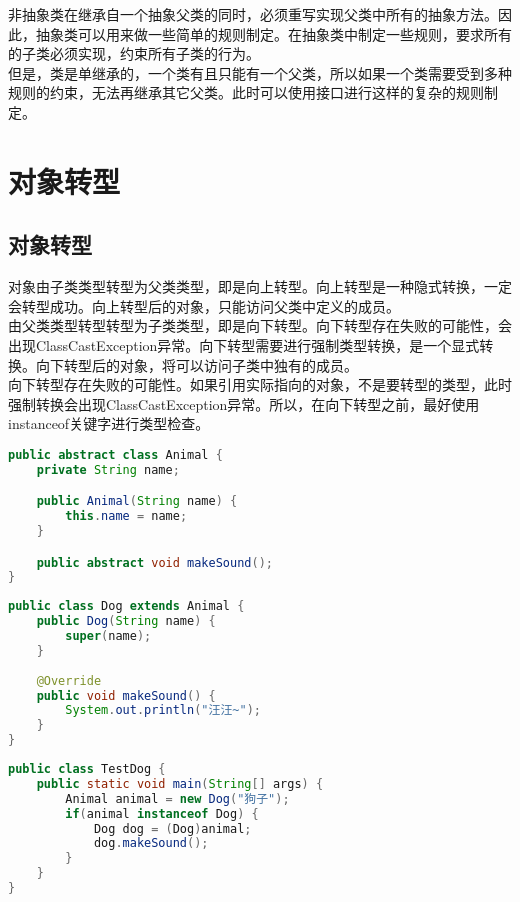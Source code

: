 非抽象类在继承自一个抽象父类的同时，必须重写实现父类中所有的抽象方法。因此，抽象类可以用来做一些简单的规则制定。在抽象类中制定一些规则，要求所有的子类必须实现，约束所有子类的行为。\\

但是，类是单继承的，一个类有且只能有一个父类，所以如果一个类需要受到多种规则的约束，无法再继承其它父类。此时可以使用接口进行这样的复杂的规则制定。

\newpage

\section{对象转型}

\subsection{对象转型}

对象由子类类型转型为父类类型，即是向上转型。向上转型是一种隐式转换，一定会转型成功。向上转型后的对象，只能访问父类中定义的成员。\\

由父类类型转型转型为子类类型，即是向下转型。向下转型存在失败的可能性，会出现ClassCastException异常。向下转型需要进行强制类型转换，是一个显式转换。向下转型后的对象，将可以访问子类中独有的成员。\\

向下转型存在失败的可能性。如果引用实际指向的对象，不是要转型的类型，此时强制转换会出现ClassCastException异常。所以，在向下转型之前，最好使用instanceof关键字进行类型检查。\\


\begin{lstlisting}[language=Java, title=Animal.java]
public abstract class Animal {
    private String name;

    public Animal(String name) {
        this.name = name;
    }

    public abstract void makeSound();
}
\end{lstlisting}

\begin{lstlisting}[language=Java, title=Dog.java]
public class Dog extends Animal {
    public Dog(String name) {
        super(name);
    }
    
    @Override
    public void makeSound() {
        System.out.println("汪汪~");
    }
}
\end{lstlisting}

\begin{lstlisting}[language=Java, title=TestDog.java]
public class TestDog {
    public static void main(String[] args) {
        Animal animal = new Dog("狗子");
        if(animal instanceof Dog) {
            Dog dog = (Dog)animal;
            dog.makeSound();
        }
    }
}
\end{lstlisting}

